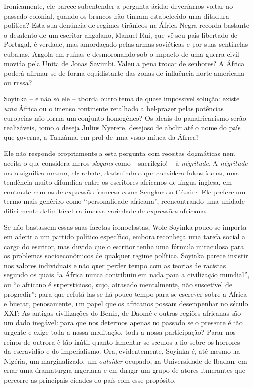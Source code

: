 \documentclass[
  letterpaper,
  DIV=11,
  numbers=noendperiod]{scrreprt}
\begin{document}
Ironicamente, ele parece subentender a pergunta ácida: deveríamos voltar
ao passado colonial, quando os brancos não tinham estabelecido uma
ditadura política? Esta sua denúncia de regimes tirânicos na África
Negra recorda bastante o desalento de um escritor angolano, Manuel Rui,
que vê seu país libertado de Portugal, é verdade, mas amordaçado pelas
armas soviéticas e por suas sentinelas cubanas. Angola em ruínas e
desmoronando sob o impacto de uma guerra civil movida pela Unita de
Jonas Savimbi. Valeu a pena trocar de senhores? A África poderá
afirmar-se de forma equidistante das zonas de influência norte-americana
ou russa?

Soyinka -- e não só ele -- aborda outro tema de quase impossível
solução: existe \emph{uma} África ou o imenso continente retalhado a
bel-prazer pelas potências europeias não forma um conjunto homogêneo? Os
ideais do panafricanismo serão realizáveis, como o deseja Julius
Nyerere, desejoso de abolir até o nome do país que governa, a Tanzânia,
em prol de uma visão mítica da África?

Ele não responde propriamente a esta pergunta com receitas dogmáticas
nem aceita o que considera meros \emph{slogans} como -- sacrilégio! -- à
\emph{négritude}. A \emph{négritude} nada significa mesmo, ele rebate,
destruindo o que considera falsos ídolos, uma tendência muito difundida
entre os escritores africanos de língua inglesa, em contraste com os de
expressão francesa como Senghor ou Césaire. Ele prefere um termo mais
genérico como ``personalidade africana'', reencontrando uma unidade
dificilmente delimitável na imensa variedade de expressões africanas.

Se não bastassem essas suas facetas iconoclastas, Wole Soyinka pouco se
importa em aderir a um partido político específico, embora reconheça uma
tarefa social a cargo do escritor, mas duvida que o escritor tenha uma
fórmula miraculosa para os problemas socioeconômicos de qualquer regime
político. Soyinka parece insistir nos valores individuais e não quer
perder tempo com as teorias de racistas segundo os quais ``a África
nunca contribuiu em nada para a civilização mundial'', ou ``o africano é
supersticioso, sujo, atrasado mentalmente, não suscetível de
progredir'': para que refutá-las se há pouco tempo para se escrever
sobre a África e buscar, penosamente, um papel que os africanos possam
desempenhar no século XXI? As antigas civilizações do Benin, de Daomé e
outras regiões africanas são um dado inegável: para que nos determos
apenas no passado se o presente é tão urgente e exige toda a nossa
meditação, toda a nossa participação? Parar nos reinos de outrora é tão
inútil quanto lamentar-se séculos a fio sobre os horrores da escravidão
e do imperialismo. Ora, evidentemente, Soyinka é, até mesmo na Nigéria,
um marginalizado, um \emph{outsider} ocupado, na Universidade de Ibadan,
em criar uma dramaturgia nigeriana e em dirigir um grupo de atores
itinerantes que percorre as principais cidades do país com esse
propósito.
\end{document}

